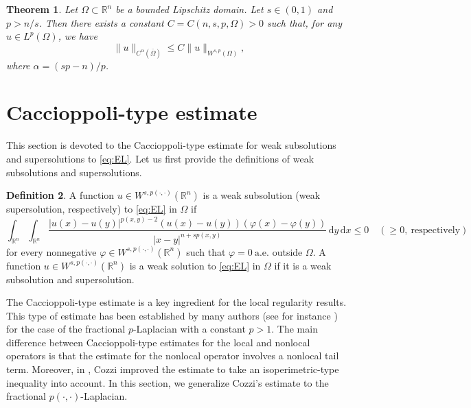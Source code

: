 \documentclass[11pt]{amsart}
\theoremstyle{plain}
\newtheorem{theorem}{Theorem}[section]
\theoremstyle{definition}
\newtheorem{definition}[theorem]{Definition}
\numberwithin{equation}{section}
\begin{document}
\begin{theorem} \label{thm:morrey} \cite[Theorem 8.2]{DNPV12}
Let $\Omega \subset \mathbb{R}^n$ be a bounded Lipschitz domain. Let $s \in (0,1)$ and $p > n/s$. Then there exists a constant $C = C(n, s, p, \Omega) > 0$ such that, for any $u \in L^p(\Omega)$, we have
\begin{equation*}
\|u\|_{C^{\alpha}(\overline{\Omega})} \leq C \|u\|_{W^{s, p}(\Omega)},
\end{equation*}
where $\alpha = (sp-n)/p$.
\end{theorem}















\section{Caccioppoli-type estimate} \label{sec:Caccioppoli}

This section is devoted to the Caccioppoli-type estimate for weak subsolutions and supersolutions to \eqref{eq:EL}. Let us first provide the definitions of weak subsolutions and supersolutions.

\begin{definition}
A function $u \in W^{s, p(\cdot,\cdot)}(\mathbb{R}^n)$ is a weak subsolution (weak supersolution, respectively) to \eqref{eq:EL} in $\Omega$ if
\begin{equation*}
\int_{\mathbb{R}^n} \int_{\mathbb{R}^n} \frac{|u(x)-u(y)|^{p(x,y)-2}(u(x)-u(y))(\varphi(x)-\varphi(y))}{|x-y|^{n+sp(x, y)}} \,\mathrm{d}y \,\mathrm{d}x \leq 0 \quad (\geq 0, ~\text{respectively})
\end{equation*}
for every nonnegative $\varphi \in W^{s, p(\cdot,\cdot)}(\mathbb{R}^n)$ such that $\varphi = 0 ~\mathrm{a.e.}$ outside $\Omega$. A function $u \in W^{s,p(\cdot, \cdot)}(\mathbb{R}^n)$ is a weak solution to \eqref{eq:EL} in $\Omega$ if it is a weak subsolution and supersolution.
\end{definition}

The Caccioppoli-type estimate is a key ingredient for the local regularity results. This type of estimate has been established by many authors (see for instance \cite{DCKP16,KMS15,BP16,Coz17}) for the case of the fractional $p$-Laplacian with a constant $p > 1$. The main difference between Caccioppoli-type estimates for the local and nonlocal operators is that the estimate for the nonlocal operator involves a nonlocal tail term. Moreover, in \cite{Coz17}, Cozzi improved the estimate to take an isoperimetric-type inequality into account. In this section, we generalize Cozzi's estimate to the fractional $p(\cdot,\cdot)$-Laplacian.
\end{document}
